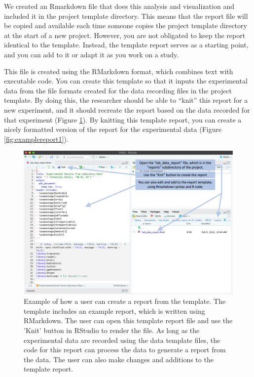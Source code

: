 \documentclass[]{tufte-book}
\begin{document}
We created an Rmarkdown file that does this analysis and visualization and
included it in the project template directory. This means that the report file
will be copied and available each time someone copies the project template
directory at the start of a new project. However, you are not obligated to keep
the report identical to the template. Instead, the template report serves as a
starting point, and you can add to it or adapt it as you work on a study.

This file is created using the RMarkdown format,
which combines text with executable code. You can create this template so that it
inputs the experimental data from the file formats created for the data recording
files in the project template. By doing this, the researcher should be able to ``knit''
this report for a new experiment, and it should recreate the report based on the
data recorded for that experiment (Figure \ref{fig:makingareport}). By knitting
this template report, you can create a nicely formatted version of the report for
the experimental data (Figure \ref{fig:examplereport1}).

\begin{figure}
\includegraphics[width=\textwidth]{figures/project_opening_and_running_report} \caption[Example of how a user can create a report from the template]{Example of how a user can create a report from the template. The template includes an example report, which is written using RMarkdown. The user can open this template report file and use the 'Knit' button in RStudio to render the file. As long as the experimental data are recorded using the data template files, the code for this report can process the data to generate a report from the data. The user can also make changes and additions to the template report.}\label{fig:makingareport}
\end{figure}
\end{document}
